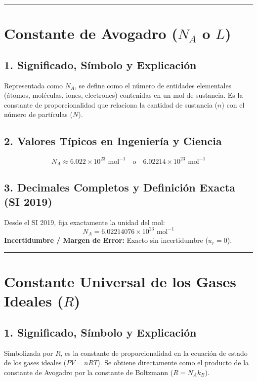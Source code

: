 \documentclass[12pt,a4paper]{article}
\begin{document}
\vspace{0.8cm}
\hrule
\vspace{0.8cm}

\section{Constante de Avogadro ($N_A$ o $L$)}

\subsection*{1. Significado, Símbolo y Explicación}
Representada como $N_A$, se define como el número de entidades elementales (átomos, moléculas, iones, electrones) contenidas en un mol de sustancia. Es la constante de proporcionalidad que relaciona la cantidad de sustancia ($n$) con el número de partículas ($N$).

\subsection*{2. Valores Típicos en Ingeniería y Ciencia}
\begin{equation*}
N_A \approx 6.022 \times 10^{23} \text{ mol}^{-1} \quad \text{o} \quad 6.02214 \times 10^{23} \text{ mol}^{-1}
\end{equation*}

\subsection*{3. Decimales Completos y Definición Exacta (SI 2019)}
Desde el SI 2019, fija exactamente la unidad del mol:
\begin{equation*}
N_A = 6.02214076 \times 10^{23} \text{ mol}^{-1}
\end{equation*}
\textbf{Incertidumbre / Margen de Error:} Exacto sin incertidumbre ($u_r = 0$).

\vspace{0.8cm}
\hrule
\vspace{0.8cm}

\section{Constante Universal de los Gases Ideales ($R$)}

\subsection*{1. Significado, Símbolo y Explicación}
Simbolizada por $R$, es la constante de proporcionalidad en la ecuación de estado de los gases ideales ($P V = n R T$). Se obtiene directamente como el producto de la constante de Avogadro por la constante de Boltzmann ($R = N_A k_B$).
\end{document}
